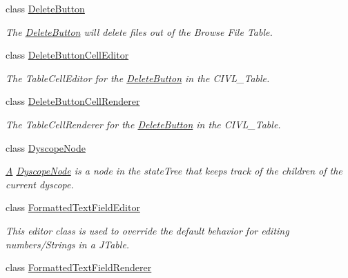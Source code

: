\begin{DoxyCompactItemize}
class \hyperlink{classedu_1_1udel_1_1cis_1_1vsl_1_1civl_1_1gui_1_1common_1_1DeleteButton}{Delete\+Button}
\begin{DoxyCompactList}\small\item\em The \hyperlink{classedu_1_1udel_1_1cis_1_1vsl_1_1civl_1_1gui_1_1common_1_1DeleteButton}{Delete\+Button} will delete files out of the Browse File Table. \end{DoxyCompactList}\item 
class \hyperlink{classedu_1_1udel_1_1cis_1_1vsl_1_1civl_1_1gui_1_1common_1_1DeleteButtonCellEditor}{Delete\+Button\+Cell\+Editor}
\begin{DoxyCompactList}\small\item\em The Table\+Cell\+Editor for the \hyperlink{classedu_1_1udel_1_1cis_1_1vsl_1_1civl_1_1gui_1_1common_1_1DeleteButton}{Delete\+Button} in the C\+I\+V\+L\+\_\+\+Table. \end{DoxyCompactList}\item 
class \hyperlink{classedu_1_1udel_1_1cis_1_1vsl_1_1civl_1_1gui_1_1common_1_1DeleteButtonCellRenderer}{Delete\+Button\+Cell\+Renderer}
\begin{DoxyCompactList}\small\item\em The Table\+Cell\+Renderer for the \hyperlink{classedu_1_1udel_1_1cis_1_1vsl_1_1civl_1_1gui_1_1common_1_1DeleteButton}{Delete\+Button} in the C\+I\+V\+L\+\_\+\+Table. \end{DoxyCompactList}\item 
class \hyperlink{classedu_1_1udel_1_1cis_1_1vsl_1_1civl_1_1gui_1_1common_1_1DyscopeNode}{Dyscope\+Node}
\begin{DoxyCompactList}\small\item\em \hyperlink{structA}{A} \hyperlink{classedu_1_1udel_1_1cis_1_1vsl_1_1civl_1_1gui_1_1common_1_1DyscopeNode}{Dyscope\+Node} is a node in the state\+Tree that keeps track of the children of the current dyscope. \end{DoxyCompactList}\item 
class \hyperlink{classedu_1_1udel_1_1cis_1_1vsl_1_1civl_1_1gui_1_1common_1_1FormattedTextFieldEditor}{Formatted\+Text\+Field\+Editor}
\begin{DoxyCompactList}\small\item\em This editor class is used to override the default behavior for editing numbers/\+Strings in a J\+Table. \end{DoxyCompactList}\item 
class \hyperlink{classedu_1_1udel_1_1cis_1_1vsl_1_1civl_1_1gui_1_1common_1_1FormattedTextFieldRenderer}{Formatted\+Text\+Field\+Renderer}

\end{DoxyCompactItemize}
